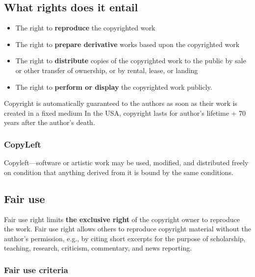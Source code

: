 \documentclass{article}
\begin{document}
\subsection{What rights does it entail}
\begin{itemize}
  \item The right to \textbf{reproduce} the copyrighted work
  \item The right to \textbf{prepare derivative} works based upon the copyrighted work
  \item The right to \textbf{distribute} copies of the copyrighted work to the public by sale or other transfer of ownership, or by rental, lease, or landing 
  \item The right to \textbf{perform or display} the copyrighted work publicly.
\end{itemize}
\begin{flushleft}
Copyright is automatically guaranteed to the authors as soon as their work is created in a fixed medium In the USA, copyright lasts for author’s lifetime + 70 years after the author’s death.
\end{flushleft}

\subsubsection{CopyLeft}

\begin{flushleft}
Copyleft—software or artistic work may be used, modified, and distributed freely on condition that anything derived from it is bound by the same conditions.
\end{flushleft}

\subsection{Fair use}

\begin{flushleft}
Fair use right limits \textbf{the exclusive right} of the copyright owner to reproduce the work. Fair use right allows others to reproduce copyright material without the author’s permission, e.g., by citing short excerpts for the purpose of scholarship, teaching, research, criticism, commentary, and news reporting.
\end{flushleft}

\subsubsection{Fair use criteria}
\end{document}
